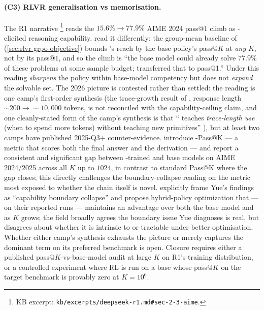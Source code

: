 \paragraph{(C3) RLVR generalisation vs memorisation.}
The R1 narrative \citep[\S 2.3]{deepseek-r1}\footnote{KB excerpt:
\texttt{kb/excerpts/deepseek-r1.md\#sec-2-3-aime}.} reads the
$15.6\%\!\to\!77.9\%$ AIME 2024 pass@1 climb as -elicited
reasoning capability. %
read it differently: the
group-mean baseline of  (\cref{sec:rlvr-grpo-objective}) bounds
's reach by the base policy's pass@$K$ at \emph{any} $K$, not by
its pass@$1$, and so the climb is ``the base model could already solve
$77.9\%$ of these problems at some sample budget;  transferred
that to pass@1.'' Under this reading  \emph{sharpens} the policy
within base-model competency but does not \emph{expand} the solvable
set. The 2026 picture is contested rather than settled: the
\citeauthor{rlvr-limits-2025} reading is one camp's first-order
synthesis (the trace-growth result of \citet[\S 2.2]{deepseek-r1},
response length $\sim 200 \to \sim 10{,}000$ tokens, is not reconciled
with the capability-ceiling claim, and one cleanly-stated form of the
camp's synthesis is that `` teaches \emph{trace-length use} (when
to spend more tokens) without teaching new primitives''
\citep[\S 5]{rlvr-limits-2025}), but at least two camps have published
2025-Q3+ counter-evidence.  introduce
-Pass@K --- a metric that scores both the final answer and the
 derivation --- and report a consistent and
significant gap between -trained and base models on
AIME 2024/2025 across all $K$ up to $1024$, in contrast to standard
Pass@K where the gap closes; this directly challenges the
boundary-collapse reading on the metric most exposed to whether the
chain itself is novel.  explicitly frame Yue's
findings as ``capability boundary collapse'' and propose
hybrid-policy optimization that --- on their reported runs ---
maintains an advantage over both the base model and  as $K$ grows;
the field broadly agrees the boundary issue Yue diagnoses is real, but
disagrees about whether it is intrinsic to  or tractable under
better optimisation. Whether either camp's synthesis exhausts the
picture or merely captures the dominant term on its preferred
benchmark is open. Closure requires
either a published pass@$K$-vs-base-model audit at large $K$ on R1's
training distribution, or a controlled experiment where RL is run on a
base whose pass@$K$ on the target benchmark is provably zero at
$K = 10^{6}$.

